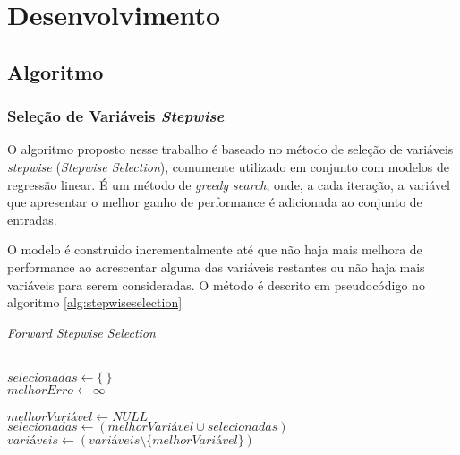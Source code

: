 \chapter[Desenvolvimento]{Desenvolvimento}

\section{Algoritmo}

\subsection{Seleção de Variáveis \textit{Stepwise}}

O algoritmo proposto nesse trabalho é baseado no método de seleção de variáveis \textit{stepwise} 
(\textit{Stepwise Selection}), comumente utilizado em conjunto com modelos de regressão linear. É um método de
\textit{greedy search}, onde, a cada iteração, a variável que apresentar o melhor ganho de performance é 
adicionada ao conjunto de entradas. 

O modelo é construido incrementalmente até que não haja mais melhora de performance ao acrescentar alguma das 
variáveis restantes ou não haja mais variáveis para serem consideradas. O método é descrito em pseudocódigo no 
algoritmo \ref{alg:stepwiseselection}

\begin{algorithm}
    \caption{\textit{Forward Stepwise Selection}}
    \ \\
    $selecionadas \gets \{\ \}$ \\
    $melhorErro \gets \infty$ \\
    \ \\
    {   
        $melhorVariável \gets NULL$ \\     
        $selecionadas \gets (melhorVariável \cup selecionadas)$ \\
        $variáveis \gets (variáveis \setminus \{melhorVariável\})$ \\
    }
    \label{alg:stepwiseselection}
\end{algorithm}

